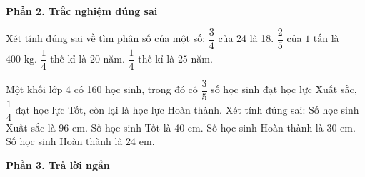 \textbf{Phần 2. Trắc nghiệm đúng sai}

\begin{ex} %
Xét tính đúng sai về tìm phân số của một số:
\choiceTF
{\True $\dfrac{3}{4}$ của 24 là 18.}
{\True $\dfrac{2}{5}$ của $1\text{ tấn}$ là $400\text{ kg}$.}
{$\dfrac{1}{4}$ thế kỉ là $20$ năm.}
{\True $\dfrac{1}{4}$ thế kỉ là $25$ năm.}
\end{ex}

\begin{ex} %
Một khối lớp 4 có 160 học sinh, trong đó có $\dfrac{3}{5}$ số học sinh đạt học lực Xuất sắc, $\dfrac{1}{4}$ đạt học lực Tốt, còn lại là học lực Hoàn thành. Xét tính đúng sai:
\choiceTF
{\True Số học sinh Xuất sắc là 96 em.}
{\True Số học sinh Tốt là 40 em.}
{Số học sinh Hoàn thành là 30 em.}
{\True Số học sinh Hoàn thành là 24 em.}
\end{ex}

\textbf{Phần 3. Trả lời ngắn}

